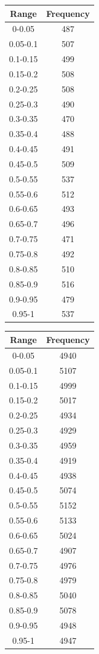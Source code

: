 \documentclass{article}
\begin{document}
\begin{table}
{ \begin{tabular}{||c | c||}  \hline
		Range & Frequency \\ [0.5ex] \hline \hline0-0.05 & 487\\
		\hline 
		0.05-0.1 & 507\\
		\hline 
		0.1-0.15 & 499\\
		\hline 
		0.15-0.2 & 508\\
		\hline 
		0.2-0.25 & 508\\
		\hline 
		0.25-0.3 & 490\\
		\hline 
		0.3-0.35 & 470\\
		\hline 
		0.35-0.4 & 488\\
		\hline 
		0.4-0.45 & 491\\
		\hline 
		0.45-0.5 & 509\\
		\hline 
		0.5-0.55 & 537\\
		\hline 
		0.55-0.6 & 512\\
		\hline 
		0.6-0.65 & 493\\
		\hline 
		0.65-0.7 & 496\\
		\hline 
		0.7-0.75 & 471\\
		\hline 
		0.75-0.8 & 492\\
		\hline 
		0.8-0.85 & 510\\
		\hline 
		0.85-0.9 & 516\\
		\hline 
		0.9-0.95 & 479\\
		\hline 
		0.95-1 & 537\\
		\hline 
	\end{tabular} 
}
\parbox{.3\linewidth}{
 \begin{tabular}{||c | c||}  \hline
		Range & Frequency \\ [0.5ex] \hline \hline0-0.05 & 4940\\
		\hline 
		0.05-0.1 & 5107\\
		\hline 
		0.1-0.15 & 4999\\
		\hline 
		0.15-0.2 & 5017\\
		\hline 
		0.2-0.25 & 4934\\
		\hline 
		0.25-0.3 & 4929\\
		\hline 
		0.3-0.35 & 4959\\
		\hline 
		0.35-0.4 & 4919\\
		\hline 
		0.4-0.45 & 4938\\
		\hline 
		0.45-0.5 & 5074\\
		\hline 
		0.5-0.55 & 5152\\
		\hline 
		0.55-0.6 & 5133\\
		\hline 
		0.6-0.65 & 5024\\
		\hline 
		0.65-0.7 & 4907\\
		\hline 
		0.7-0.75 & 4976\\
		\hline 
		0.75-0.8 & 4979\\
		\hline 
		0.8-0.85 & 5040\\
		\hline 
		0.85-0.9 & 5078\\
		\hline 
		0.9-0.95 & 4948\\
		\hline 
		0.95-1 & 4947\\
		\hline 
	\end{tabular} 
}

\end{table}
\end{document}
